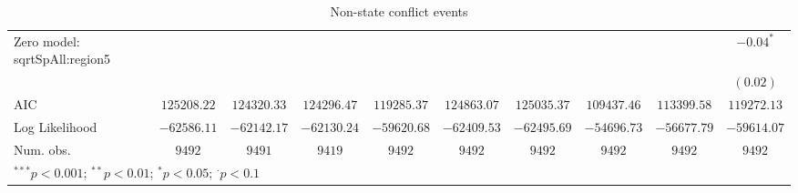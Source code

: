 \begin{table}
\begin{center}
{\begin{tabular}{l c c c c c c c c c}
Zero model: sqrtSpAll:region5  &               &               &               &                 &               &                 &                 &               & $-0.04^{*}$   \\
                               &               &               &               &                 &               &                 &                 &               & $(0.02)$      \\
\midrule
AIC                            & $125208.22$   & $124320.33$   & $124296.47$   & $119285.37$     & $124863.07$   & $125035.37$     & $109437.46$     & $113399.58$   & $119272.13$   \\
Log Likelihood                 & $-62586.11$   & $-62142.17$   & $-62130.24$   & $-59620.68$     & $-62409.53$   & $-62495.69$     & $-54696.73$     & $-56677.79$   & $-59614.07$   \\
Num. obs.                      & $9492$        & $9491$        & $9419$        & $9492$          & $9492$        & $9492$          & $9492$          & $9492$        & $9492$        \\
\bottomrule
\multicolumn{10}{l}{\scriptsize{$^{***}p<0.001$; $^{**}p<0.01$; $^{*}p<0.05$; $^{\cdot}p<0.1$}}
\end{tabular}
}
\caption{Non-state conflict events}
\label{znon_state}
\end{center}
\end{table}
